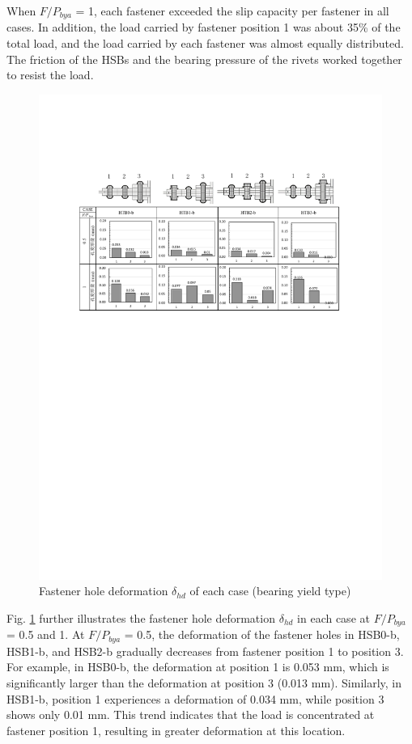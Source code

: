 When $F / P_{bya}$ = 1, each fastener exceeded the slip capacity per fastener in all cases. In addition, the load carried by fastener position 1 was about 35\% of the total load, and the load carried by each fastener was almost equally distributed. The friction of the \ac{HSB}s and the bearing pressure of the rivets worked together to resist the load.

\begin{figure}[htbp]
\centering
\includegraphics[width=\textwidth]{imgs/ch4/fig19.pdf}
\caption{Fastener hole deformation $\delta_{hd}$ of each case (bearing yield type)}
\label{ch4fig19}
\end{figure}

Fig. \ref{ch4fig19} further illustrates the fastener hole deformation $\delta_{hd}$ in each case at $F / P_{bya}$ = 0.5 and 1. At $F / P_{bya}$ = 0.5, the deformation of the fastener holes in HSB0-b, HSB1-b, and HSB2-b gradually decreases from fastener position 1 to position 3. For example, in HSB0-b, the deformation at position 1 is 0.053 mm, which is significantly larger than the deformation at position 3 (0.013 mm). Similarly, in HSB1-b, position 1 experiences a deformation of 0.034 mm, while position 3 shows only 0.01 mm. This trend indicates that the load is concentrated at fastener position 1, resulting in greater deformation at this location.

